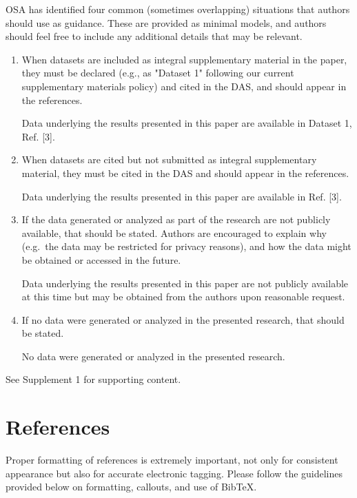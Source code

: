 \documentclass{osa-article}
\begin{document}
\begin{backmatter}
OSA has identified four common (sometimes overlapping) situations that authors should use as guidance. These are provided as minimal models, and authors should feel free to
include any additional details that may be relevant.

\begin{enumerate}
\item When datasets are included as integral supplementary material in the paper, they must be declared (e.g., as "Dataset 1" following our current supplementary materials policy) and cited in the DAS, and should appear in the references.

 Data underlying the results presented in this paper are available in Dataset 1, Ref. [3].

\bigskip

\item When datasets are cited but not submitted as integral supplementary material, they must be cited in the DAS and should appear in the references.

 Data underlying the results presented in this paper are available in Ref. [3].

\bigskip

\item If the data generated or analyzed as part of the research are not publicly available, that should be stated. Authors are encouraged to explain why (e.g.~the data may be restricted for privacy reasons), and how the data might be obtained or accessed in the future.

 Data underlying the results presented in this paper are not publicly available at this time but may be obtained from the authors upon reasonable request.

\bigskip

\item If no data were generated or analyzed in the presented research, that should be stated.

 No data were generated or analyzed in the presented research.
\end{enumerate}


See Supplement 1 for supporting content. 

\end{backmatter}

\section{References}
\label{sec:refs}
Proper formatting of references is extremely important, not only for consistent appearance but also for accurate electronic tagging. Please follow the guidelines provided below on formatting, callouts, and use of Bib\TeX.
\end{document}
